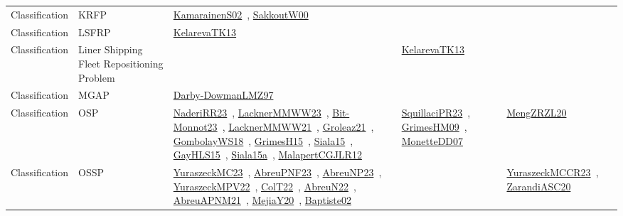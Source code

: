 {\begin{longtable}{lp{3cm}>{\raggedright\arraybackslash}p{6cm}>{\raggedright\arraybackslash}p{6cm}>{\raggedright\arraybackslash}p{8cm}}
Classification & KRFP & \href{../works/KamarainenS02.pdf}{KamarainenS02}~\cite{KamarainenS02}, \href{../works/SakkoutW00.pdf}{SakkoutW00}~\cite{SakkoutW00} &  & \\
Classification & LSFRP & \href{../works/KelarevaTK13.pdf}{KelarevaTK13}~\cite{KelarevaTK13} &  & \\
Classification & Liner Shipping Fleet Repositioning Problem &  & \href{../works/KelarevaTK13.pdf}{KelarevaTK13}~\cite{KelarevaTK13} & \\
Classification & MGAP & \href{../works/Darby-DowmanLMZ97.pdf}{Darby-DowmanLMZ97}~\cite{Darby-DowmanLMZ97} &  & \\
Classification & OSP & \href{../works/NaderiRR23.pdf}{NaderiRR23}~\cite{NaderiRR23}, \href{../works/LacknerMMWW23.pdf}{LacknerMMWW23}~\cite{LacknerMMWW23}, \href{../works/Bit-Monnot23.pdf}{Bit-Monnot23}~\cite{Bit-Monnot23}, \href{../works/LacknerMMWW21.pdf}{LacknerMMWW21}~\cite{LacknerMMWW21}, \href{../works/Groleaz21.pdf}{Groleaz21}~\cite{Groleaz21}, \href{../works/GombolayWS18.pdf}{GombolayWS18}~\cite{GombolayWS18}, \href{../works/GrimesH15.pdf}{GrimesH15}~\cite{GrimesH15}, \href{../works/Siala15.pdf}{Siala15}~\cite{Siala15}, \href{../works/GayHLS15.pdf}{GayHLS15}~\cite{GayHLS15}, \href{../works/Siala15a.pdf}{Siala15a}~\cite{Siala15a}, \href{../works/MalapertCGJLR12.pdf}{MalapertCGJLR12}~\cite{MalapertCGJLR12} & \href{../works/SquillaciPR23.pdf}{SquillaciPR23}~\cite{SquillaciPR23}, \href{../works/GrimesHM09.pdf}{GrimesHM09}~\cite{GrimesHM09}, \href{../works/MonetteDD07.pdf}{MonetteDD07}~\cite{MonetteDD07} & \href{../works/MengZRZL20.pdf}{MengZRZL20}~\cite{MengZRZL20}\\
Classification & OSSP & \href{../works/YuraszeckMC23.pdf}{YuraszeckMC23}~\cite{YuraszeckMC23}, \href{../works/AbreuPNF23.pdf}{AbreuPNF23}~\cite{AbreuPNF23}, \href{../works/AbreuNP23.pdf}{AbreuNP23}~\cite{AbreuNP23}, \href{../works/YuraszeckMPV22.pdf}{YuraszeckMPV22}~\cite{YuraszeckMPV22}, \href{../works/ColT22.pdf}{ColT22}~\cite{ColT22}, \href{../works/AbreuN22.pdf}{AbreuN22}~\cite{AbreuN22}, \href{../works/AbreuAPNM21.pdf}{AbreuAPNM21}~\cite{AbreuAPNM21}, \href{../works/MejiaY20.pdf}{MejiaY20}~\cite{MejiaY20}, \href{../works/Baptiste02.pdf}{Baptiste02}~\cite{Baptiste02} &  & \href{../works/YuraszeckMCCR23.pdf}{YuraszeckMCCR23}~\cite{YuraszeckMCCR23}, \href{../works/ZarandiASC20.pdf}{ZarandiASC20}~\cite{ZarandiASC20}\\

\end{longtable}}

